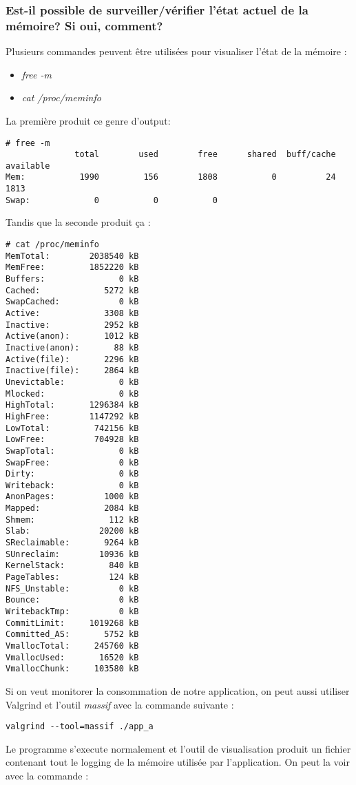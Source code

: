 \subsubsection{Est-il possible de surveiller/vérifier l'état actuel de la mémoire? Si oui, comment?}
Plusieurs commandes peuvent être utilisées pour visualiser l'état de la mémoire :
\begin{itemize}
\item \textit{free -m}
\item \textit{cat /proc/meminfo}
\end{itemize}
La première produit ce genre d'output:
\begin{lstlisting}
# free -m
              total        used        free      shared  buff/cache   available
Mem:           1990         156        1808           0          24        1813
Swap:             0           0           0
\end{lstlisting}
Tandis que la seconde produit ça :
\begin{lstlisting}
# cat /proc/meminfo 
MemTotal:        2038540 kB
MemFree:         1852220 kB
Buffers:               0 kB
Cached:             5272 kB
SwapCached:            0 kB
Active:             3308 kB
Inactive:           2952 kB
Active(anon):       1012 kB
Inactive(anon):       88 kB
Active(file):       2296 kB
Inactive(file):     2864 kB
Unevictable:           0 kB
Mlocked:               0 kB
HighTotal:       1296384 kB
HighFree:        1147292 kB
LowTotal:         742156 kB
LowFree:          704928 kB
SwapTotal:             0 kB
SwapFree:              0 kB
Dirty:                 0 kB
Writeback:             0 kB
AnonPages:          1000 kB
Mapped:             2084 kB
Shmem:               112 kB
Slab:              20200 kB
SReclaimable:       9264 kB
SUnreclaim:        10936 kB
KernelStack:         840 kB
PageTables:          124 kB
NFS_Unstable:          0 kB
Bounce:                0 kB
WritebackTmp:          0 kB
CommitLimit:     1019268 kB
Committed_AS:       5752 kB
VmallocTotal:     245760 kB
VmallocUsed:       16520 kB
VmallocChunk:     103580 kB
\end{lstlisting}
Si on veut monitorer la consommation de notre application, on peut aussi utiliser Valgrind et l'outil \textit{massif} avec la commande suivante : 
\begin{lstlisting}
valgrind --tool=massif ./app_a
\end{lstlisting}
Le programme s'execute normalement et l'outil de visualisation produit un fichier contenant tout le logging de la mémoire utilisée par l'application. On peut la voir avec la commande :
